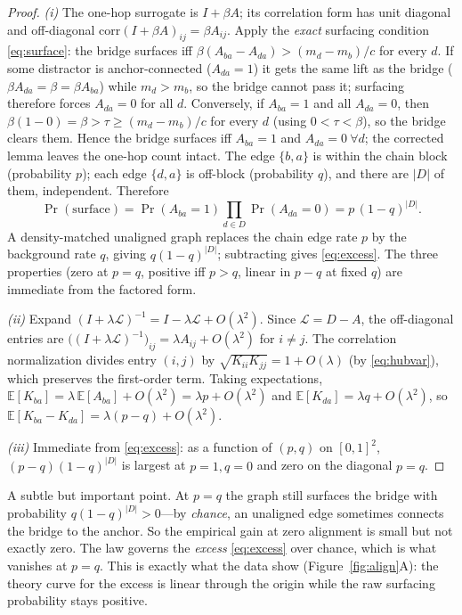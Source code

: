 \documentclass[11pt]{article}
\theoremstyle{plain}
\theoremstyle{definition}
\theoremstyle{remark}
\newcommand{\E}{\mathbb{E}}\newcommand{\R}{\mathbb{R}}\newcommand{\N}{\mathcal{N}}
\newcommand{\corr}{\mathrm{corr}}\newcommand{\GP}{\mathcal{GP}}\newcommand{\Var}{\mathrm{Var}}
\begin{document}
\begin{proof}
\emph{(i)} The one-hop surrogate is $I+\beta A$; its correlation form has unit diagonal and off-diagonal
$\corr(I+\beta A)_{ij}=\beta A_{ij}$. Apply the \emph{exact} surfacing condition \eqref{eq:surface}: the bridge
surfaces iff $\beta(A_{ba}-A_{da})>(m_d-m_b)/c$ for every $d$. If some distractor is anchor-connected ($A_{da}=1$)
it gets the same lift as the bridge ($\beta A_{da}=\beta=\beta A_{ba}$) while $m_d>m_b$, so the bridge cannot pass
it; surfacing therefore forces $A_{da}=0$ for all $d$. Conversely, if $A_{ba}=1$ and all $A_{da}=0$, then
$\beta(1-0)=\beta>\tau\ge(m_d-m_b)/c$ for every $d$ (using $0<\tau<\beta$), so the bridge clears them. Hence the
bridge surfaces iff $A_{ba}=1$ and $A_{da}=0\ \forall d$; the corrected lemma leaves the one-hop count intact. The
edge $\{b,a\}$ is within the chain block (probability $p$); each edge $\{d,a\}$ is off-block (probability $q$), and
there are $|D|$ of them, independent. Therefore
\[
\Pr(\text{surface})=\Pr(A_{ba}=1)\prod_{d\in D}\Pr(A_{da}=0)=p\,(1-q)^{|D|}.
\]
A density-matched unaligned graph replaces the chain edge rate $p$ by the background rate $q$, giving
$q(1-q)^{|D|}$; subtracting gives \eqref{eq:excess}. The three properties (zero at $p=q$, positive iff $p>q$, linear
in $p-q$ at fixed $q$) are immediate from the factored form.

\emph{(ii)} Expand $(I+\lambda\mathcal L)^{-1}=I-\lambda\mathcal L+O(\lambda^2)$. Since $\mathcal L=D-A$, the
off-diagonal entries are $\big((I+\lambda\mathcal L)^{-1}\big)_{ij}=\lambda A_{ij}+O(\lambda^2)$ for $i\neq j$. The
correlation normalization divides entry $(i,j)$ by $\sqrt{K_{ii}K_{jj}}=1+O(\lambda)$ (by \eqref{eq:hubvar}), which
preserves the first-order term. Taking expectations, $\E[K_{ba}]=\lambda\,\E[A_{ba}]+O(\lambda^2)=\lambda p+O(\lambda^2)$
and $\E[K_{da}]=\lambda q+O(\lambda^2)$, so $\E[K_{ba}-K_{da}]=\lambda(p-q)+O(\lambda^2)$.

\emph{(iii)} Immediate from \eqref{eq:excess}: as a function of $(p,q)$ on $[0,1]^2$, $(p-q)(1-q)^{|D|}$ is largest
at $p=1,q=0$ and zero on the diagonal $p=q$.
\end{proof}

\begin{remark}
A subtle but important point. At $p=q$ the graph still surfaces the bridge with probability $q(1-q)^{|D|}>0$---by
\emph{chance}, an unaligned edge sometimes connects the bridge to the anchor. So the empirical gain at zero
alignment is small but not exactly zero. The law governs the \emph{excess} \eqref{eq:excess} over chance, which is
what vanishes at $p=q$. This is exactly what the data show (Figure~\ref{fig:align}A): the theory curve for the
excess is linear through the origin while the raw surfacing probability stays positive.
\end{remark}
\end{document}
